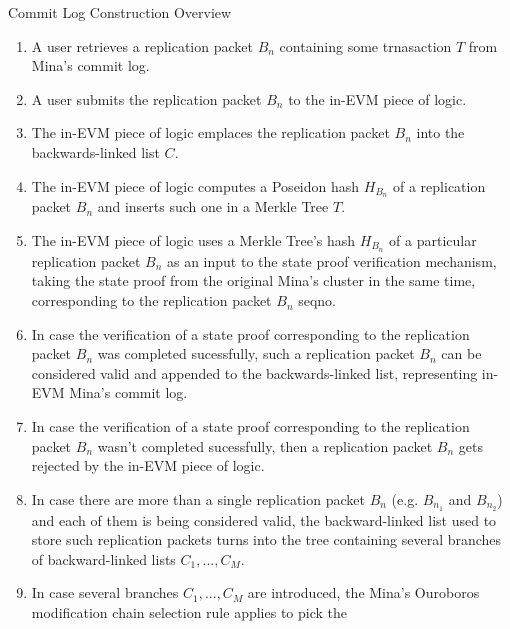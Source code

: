 \begin{algorithm}
    \caption{Commit Log Construction Overview}
    \label{commitlog}
    \begin{enumerate}
        \item A user retrieves a replication packet $B_{n}$ containing some trnasaction $T$ 
            from Mina's commit log.
        \item A user submits the replication packet $B_{n}$ to the in-EVM piece of logic.
        \item The in-EVM piece of logic emplaces the replication packet $B_{n}$
            into the backwards-linked list $C$.
        \item The in-EVM piece of logic computes a Poseidon hash $H_{B_{n}}$ of
            a replication packet $B_{n}$ and inserts such one in a Merkle Tree
            $T$.
        \item The in-EVM piece of logic uses a Merkle Tree's hash $H_{B_{n}}$ of
            a particular replication packet $B_{n}$ as an input to the
            state proof verification mechanism, taking the state proof from the
            original Mina's cluster in the same time, corresponding to the
            replication packet $B_{n}$ seqno.
        \item In case the verification of a state proof corresponding to the
            replication packet $B_{n}$ was completed sucessfully,
            such a replication packet $B_{n}$ can be considered valid and appended 
            to the backwards-linked list, representing in-EVM Mina's
            commit log.
        \item In case the verification of a state proof corresponding to the
            replication packet $B_{n}$ wasn't completed sucessfully, then a
            replication packet $B_{n}$ gets rejected by the in-EVM piece of
            logic.
        \item In case there are more than a single replication packet $B_{n}$
            (e.g. $B_{n_1}$ and $B_{n_2}$) and each of them is being considered
            valid, the backward-linked list used to store such replication
            packets turns into the tree containing several branches of
            backward-linked lists ${C_1, ... , C_M}$.
        \item In case several branches ${C_1, ... , C_M}$ are introduced, the
            Mina's Ouroboros modification chain selection rule applies to pick
            the 
    \end{enumerate}
\end{algorithm}

